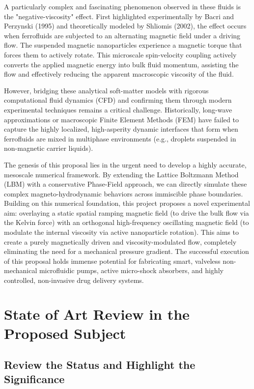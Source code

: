 \documentclass[11pt, a4paper]{article}
\begin{document}
A particularly complex and fascinating phenomenon observed in these fluids is the "negative-viscosity" effect. First highlighted experimentally by Bacri and Perzynski (1995) and theoretically modeled by Shliomis (2002), the effect occurs when ferrofluids are subjected to an alternating magnetic field under a driving flow. The suspended magnetic nanoparticles experience a magnetic torque that forces them to actively rotate. This microscale spin-velocity coupling actively converts the applied magnetic energy into bulk fluid momentum, assisting the flow and effectively reducing the apparent macroscopic viscosity of the fluid.

However, bridging these analytical soft-matter models with rigorous computational fluid dynamics (CFD) and confirming them through modern experimental techniques remains a critical challenge. Historically, long-wave approximations or macroscopic Finite Element Methods (FEM) have failed to capture the highly localized, high-asperity dynamic interfaces that form when ferrofluids are mixed in multiphase environments (e.g., droplets suspended in non-magnetic carrier liquids). 

The genesis of this proposal lies in the urgent need to develop a highly accurate, mesoscale numerical framework. By extending the Lattice Boltzmann Method (LBM) with a conservative Phase-Field approach, we can directly simulate these complex magneto-hydrodynamic behaviors across immiscible phase boundaries. Building on this numerical foundation, this project proposes a novel experimental aim: overlaying a static spatial ramping magnetic field (to drive the bulk flow via the Kelvin force) with an orthogonal high-frequency oscillating magnetic field (to modulate the internal viscosity via active nanoparticle rotation). This aims to create a purely magnetically driven and viscosity-modulated flow, completely eliminating the need for a mechanical pressure gradient. The successful execution of this proposal holds immense potential for fabricating smart, valveless non-mechanical microfluidic pumps, active micro-shock absorbers, and highly controlled, non-invasive drug delivery systems.

\section{State of Art Review in the Proposed Subject}

\subsection{Review the Status and Highlight the Significance}
\end{document}
